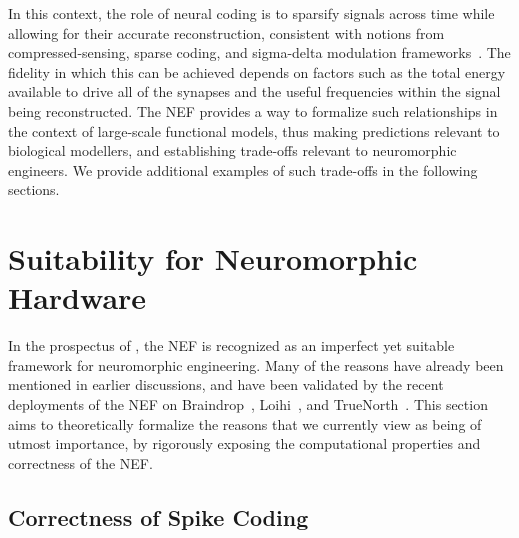 In this context, the role of neural coding is to sparsify signals across time while allowing for their accurate reconstruction, consistent with notions from compressed-sensing, sparse coding, and sigma-delta modulation frameworks~\citep{coulter2010adaptive, chklovskii2012neuronal, yoon2017lif}.
The fidelity in which this can be achieved depends on factors such as the total energy available to drive all of the synapses and the useful frequencies within the signal being reconstructed.
The NEF provides a way to formalize such relationships in the context of large-scale functional models, thus making predictions relevant to biological modellers, and establishing trade-offs relevant to neuromorphic engineers.
We provide additional examples of such trade-offs in the following sections.

\section{Suitability for Neuromorphic Hardware}
\label{sec:nef-suitability}

In the prospectus of \citet{boahen2017neuromorph}, the NEF is recognized as an imperfect yet suitable framework for neuromorphic engineering.
Many of the reasons have already been mentioned in earlier discussions, and have been 
validated by the recent deployments of the NEF on Braindrop~\citep{braindrop2019}, Loihi~\citep{blouw2018a}, and TrueNorth~\citep{fischl2018}.
This section aims to theoretically formalize the reasons that we currently view as being of utmost importance, by rigorously exposing the computational properties and correctness of the NEF.

\subsection{Correctness of Spike Coding}
\label{sec:spike-coding}

